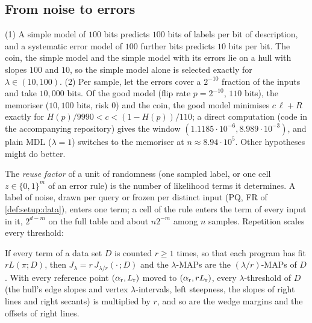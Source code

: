 \subsection{From noise to errors}\label{sec:teacher:hanni}\label{sec:limits:schedule}

\begin{remark}\label{rem:teacher:hanni}
(1) A simple model of $100$ bits predicts $100$ bits of labels per bit of description, and a systematic error model of $100$ further bits predicts $10$ bits per bit. The coin, the simple model and the simple model with its errors lie on a hull with slopes $100$ and $10$, so the simple model alone is selected exactly for $\lambda\in(10,100)$. (2) Per sample, let the errors cover a $2^{-10}$ fraction of the inputs and take $10{,}000$ bits. Of the good model (flip rate $p=2^{-10}$, $110$ bits), the memoriser ($10{,}100$ bits, risk $0$) and the coin, the good model minimises $c\,\ell+R$ exactly for $H(p)/9990<c<(1-H(p))/110$; a direct computation (code in the accompanying repository) gives the window $(1.1185\cdot10^{-6},8.989\cdot10^{-3})$, and plain MDL ($\lambda=1$) switches to the memoriser at $n\approx8.94\cdot10^5$. Other hypotheses might do better.
\end{remark}

The \emph{reuse factor} of a unit of randomness (one sampled label, or one cell $z\in\{0,1\}^m$ of an error rule) is the number of likelihood terms it determines. A label of noise, drawn per query or frozen per distinct input (PQ, FR of \cref{def:setup:data}), enters one term; a cell of the rule enters the term of every input in it, $2^{d-m}$ on the full table and about $n2^{-m}$ among $n$ samples. Repetition scales every threshold:

\begin{lemma}[Duplication]\label{lem:teacher:reuse}
If every term of a data set $D$ is counted $r\ge1$ times, so that each program has fit $rL(\pi;D)$, then $J_\lambda=r\,J_{\lambda/r}(\cdot\,;D)$ and the $\lambda$-MAPs are the $(\lambda/r)$-MAPs of $D$. With every reference point $(\alpha_{\rm r},L_{\rm r})$ moved to $(\alpha_{\rm r},rL_{\rm r})$, every $\lambda$-threshold of $D$ (the hull's edge slopes and vertex $\lambda$-intervals, left steepness, the slopes of right lines and right secants) is multiplied by $r$, and so are the wedge margins and the offsets of right lines.
\end{lemma}

